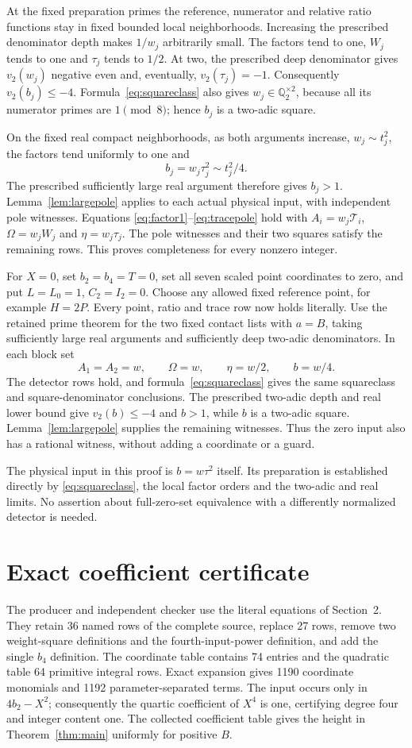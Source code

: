 \documentclass[11pt,a4paper]{article}
\newcommand{\Q}{\mathbb Q}\newcommand{\Z}{\mathbb Z}
\begin{document}
At the fixed preparation primes the reference, numerator and relative
ratio functions stay in fixed bounded local neighborhoods. Increasing
the prescribed denominator depth makes $1/w_j$ arbitrarily small.
The factors tend to one, $W_j$ tends to one and $\tau_j$ tends
to $1/2$. At two, the prescribed deep denominator gives
$v_2(w_j)$ negative even and, eventually, $v_2(\tau_j)=-1$.
Consequently $v_2(b_j)\le-4$. Formula~\eqref{eq:squareclass}
also gives $w_j\in\Q_2^{\times2}$, because all its numerator
primes are $1\pmod8$; hence $b_j$ is a two-adic square.

On the fixed real compact neighborhoods, as both arguments increase,
$w_j\sim t_j^2$, the factors tend uniformly to one and
\[
                          b_j=w_j\tau_j^2\sim t_j^2/4.
\]
The prescribed sufficiently large real argument therefore gives
$b_j>1$. Lemma~\ref{lem:largepole} applies to each actual physical
input, with independent pole witnesses. Equations
\eqref{eq:factor1}--\eqref{eq:tracepole} hold with
$A_i=w_j\mathcal T_i$, $\Omega=w_jW_j$ and $\eta=w_j\tau_j$.
The pole witnesses and their two squares satisfy the remaining rows.
This proves completeness for every nonzero integer.

For $X=0$, set $b_2=b_4=T=0$, set all seven scaled point
coordinates to zero, and put $L=L_0=1$, $C_2=I_2=0$.
Choose any allowed fixed reference point, for example $H=2P$.
Every point, ratio and trace row now holds literally.
Use the retained prime theorem for the two fixed contact lists with
$a=B$, taking sufficiently large real arguments and sufficiently deep
two-adic denominators. In each block set
\[
 A_1=A_2=w,\qquad \Omega=w,\qquad
 \eta=w/2,\qquad b=w/4.
\]
The detector rows hold, and formula~\eqref{eq:squareclass} gives
the same squareclass and square-denominator conclusions.
The prescribed two-adic depth and real lower bound give
$v_2(b)\le-4$ and $b>1$, while $b$ is a two-adic square.
Lemma~\ref{lem:largepole} supplies the remaining witnesses.
Thus the zero input also has a rational witness, without adding a
coordinate or a guard.

The physical input in this proof is $b=w\tau^2$ itself.
Its preparation is established directly by
\eqref{eq:squareclass}, the local factor orders and the two-adic and
real limits. No assertion about full-zero-set equivalence with
a differently normalized detector is needed.

\section{Exact coefficient certificate}
The producer and independent checker use the literal equations of
Section~2. They retain 36 named rows of the complete source, replace
27 rows, remove two weight-square definitions and the fourth-input-power
definition, and add the single $b_4$ definition.
The coordinate table contains 74 entries and the quadratic table
64 primitive integral rows. Exact expansion gives 1190 coordinate
monomials and 1192 parameter-separated terms.
The input occurs only in $4b_2-X^2$; consequently the quartic coefficient
of $X^4$ is one, certifying degree four and integer content one.
The collected coefficient table gives the height in
Theorem~\ref{thm:main} uniformly for positive $B$.
\end{document}
